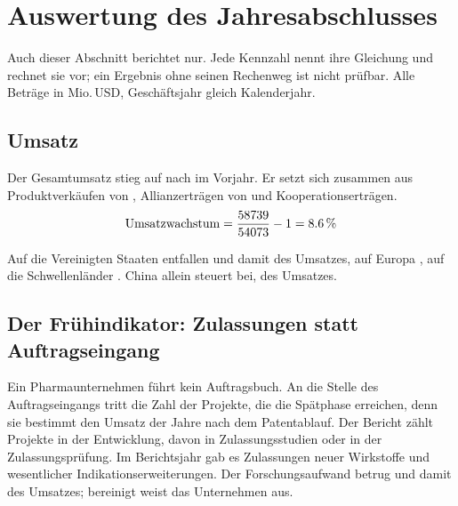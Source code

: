 \section{Auswertung des Jahresabschlusses}
\label{sec:abschluss-azn}

Auch dieser Abschnitt berichtet nur. Jede Kennzahl nennt ihre Gleichung und
rechnet sie vor; ein Ergebnis ohne seinen Rechenweg ist nicht pr\"ufbar.
Alle Betr\"age in Mio.\,USD, Gesch\"aftsjahr gleich Kalenderjahr.

\subsection{Umsatz}

Der Gesamtumsatz stieg \Pct{\AznUmsatzWachstum} auf \MioUSD{\AznUmsatzXXV}
nach \MioUSD{\AznUmsatzXXIV} im Vorjahr.
Er setzt sich zusammen aus Produktverk\"aufen von \MioUSD{\AznProduktumsatz},
Allianzertr\"agen von \MioUSD{\AznAllianzumsatz} und
Kooperationsertr\"agen.
\[
  \text{Umsatzwachstum} = \frac{\AznUmsatzXXV}{\AznUmsatzXXIV} - 1
  = \Pct{\AznUmsatzWachstum}
\]

Auf die Vereinigten Staaten entfallen \MioUSD{\AznUmsatzUsa} und damit
\Pct{\AznUsaAnteil} des Umsatzes, auf Europa \MioUSD{\AznUmsatzEuropa}, auf die
Schwellenl\"ander \MioUSD{\AznUmsatzSchwellen}.
China allein steuert \MioUSD{\AznUmsatzChina} bei, \Pct{\AznChinaAnteil} des
Umsatzes.

\subsection{Der Fr\"uhindikator: Zulassungen statt Auftragseingang}

Ein Pharmaunternehmen f\"uhrt kein Auftragsbuch. An die Stelle des
Auftragseingangs tritt die Zahl der Projekte, die die Sp\"atphase erreichen,
denn sie bestimmt den Umsatz der Jahre nach dem Patentablauf. Der Bericht
z\"ahlt \Stueck{\AznPipeline} Projekte in der Entwicklung, davon
\Stueck{\AznSpaetphase} in Zulassungsstudien oder in der
Zulassungspr\"ufung.
Im Berichtsjahr gab es \Stueck{\AznZulassungen} Zulassungen neuer Wirkstoffe
und wesentlicher Indikationserweiterungen.
Der Forschungsaufwand betrug \MioUSD{\AznForschung} und damit
\Pct{\AznForschungsquote} des Umsatzes; bereinigt weist das Unternehmen
\MioUSD{\AznForschungCore} aus.


